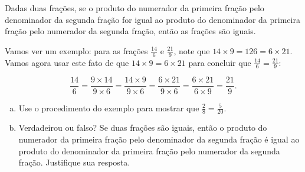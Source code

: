 \begin{atividade}{}

Dadas duas frações, se o produto do numerador da primeira fração pelo denominador da segunda fração for igual ao produto do denominador da primeira fração pelo numerador da segunda fração, então as frações são iguais.

Vamos ver um exemplo: para as frações $\frac{14}{6}$ e $\frac{21}{9}$, note que  $14 \times 9 = 126 = 6 \times 21$. Vamos agora usar este fato de que $14 \times 9 = 6 \times 21$
para concluir que $\frac{14}{6} = \frac{21}{9}$:

$$\frac{14}{6} = \frac{9 \times 14}{9 \times 6} = \frac{14 \times 9}{9 \times 6} = \frac{6 \times 21}{9 \times 6} = \frac{6 \times 21}{6 \times 9} = \frac{21}{9}.$$

\begin{enumerate}[a)]
 \item Use o procedimento do exemplo para mostrar que $\frac{2}{8} = \frac{5}{20}$.
 \item Verdadeirou ou falso? Se duas frações são iguais, então o produto do numerador da primeira fração pelo denominador da segunda fração é igual ao produto do denominador da primeira fração pelo numerador da segunda fração. Justifique sua resposta.
\end{enumerate}
\end{atividade}


